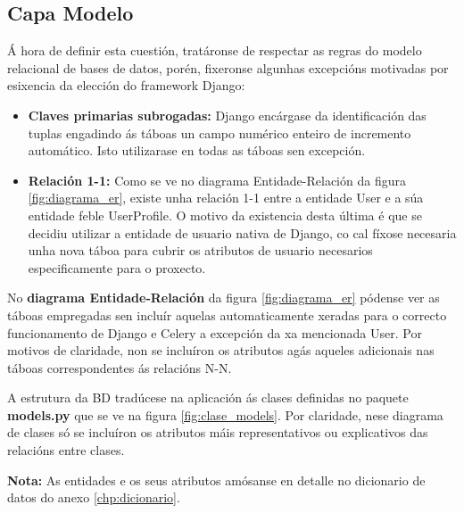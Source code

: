 \subsection{Capa Modelo}

Á hora de definir esta cuestión, tratáronse de respectar as regras do modelo relacional de bases de datos, porén, fixeronse algunhas excepcións motivadas por esixencia da elección do framework Django:

\begin{itemize}
	\item \textbf{Claves primarias subrogadas:} Django encárgase da identificación das tuplas engadindo ás táboas un campo numérico enteiro de incremento automático. Isto utilizarase en todas as táboas sen excepción.
	
	\item \textbf{Relación 1-1:} Como se ve no diagrama Entidade-Relación da figura \ref{fig:diagrama_er}, existe unha relación 1-1 entre a entidade User e a súa entidade feble UserProfile. O motivo da existencia desta última é que se decidiu utilizar a entidade de usuario nativa de Django, co cal fíxose necesaria unha nova táboa para cubrir os atributos de usuario necesarios especificamente para o proxecto. 
\end{itemize}

No \textbf{diagrama Entidade-Relación} da figura \ref{fig:diagrama_er} pódense ver as táboas empregadas sen incluír aquelas automaticamente xeradas para o correcto funcionamento de Django e Celery a excepción da xa mencionada User. Por motivos de claridade, non se incluíron os atributos agás aqueles adicionais nas táboas correspondentes ás relacións N-N.

A estrutura da BD tradúcese na aplicación ás clases definidas no paquete \textbf{models.py} que se ve na figura \ref{fig:clase_models}. Por claridade, nese diagrama de clases só se incluíron os atributos máis representativos ou explicativos das relacións entre clases.

\textbf{Nota:} As entidades e os seus atributos amósanse en detalle no dicionario de datos do anexo \ref{chp:dicionario}.

